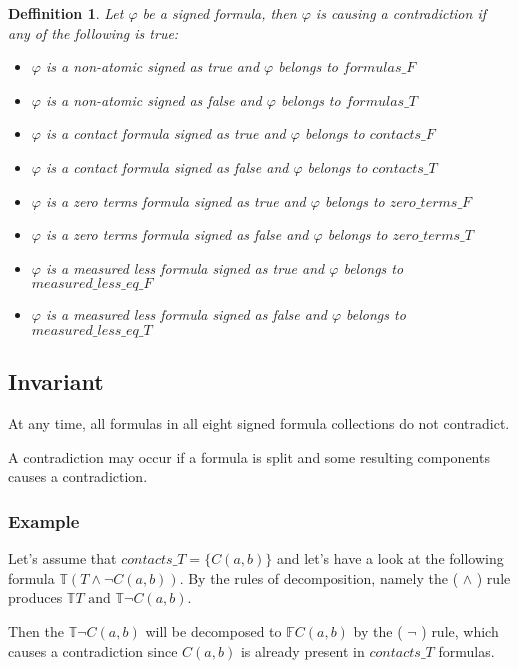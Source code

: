 \documentclass{article}
\newtheorem{defn}[theorem]{Deffinition}
\begin{document}
	\begin{defn}
	Let $\varphi$ be a signed formula, then $\varphi$ is causing a contradiction if any of the following is true:
	\begin{itemize}
		\item $\varphi$ is a non-atomic signed as true and $\varphi$ belongs to $formulas\_F$
		\item $\varphi$ is a non-atomic signed as false and $\varphi$ belongs to $formulas\_T$
		\item $\varphi$ is a contact formula signed as true and $\varphi$ belongs to $contacts\_F$
		\item $\varphi$ is a contact formula signed as false and $\varphi$ belongs to $contacts\_T$
		\item $\varphi$ is a zero terms formula signed as true and $\varphi$ belongs to $zero\_terms\_F$
		\item $\varphi$ is a zero terms formula signed as false and $\varphi$ belongs to $zero\_terms\_T$
		\item $\varphi$ is a measured less formula signed as true and $\varphi$ belongs to $measured\_less\_eq\_F$
		\item $\varphi$ is a measured less formula signed as false and $\varphi$ belongs to $measured\_less\_eq\_T$
	\end{itemize}
	\end{defn}
	\subsection*{Invariant}
	At any time, all formulas in all eight signed formula collections do not contradict.

	A contradiction may occur if a formula is split and some resulting components causes a contradiction.

	\subsubsection*{Example}
	Let's assume that $contacts\_T = \{ C(a, b)\}$ and let's have a look at the following formula $\mathbb{T}(T \wedge \neg C(a,b))$.
	\newline
	By the rules of decomposition, namely the ( $\wedge$ ) rule produces $\mathbb{T}T \text{ and } \mathbb{T}\neg C(a,b)$.

	Then the $\mathbb{T}\neg C(a,b)$ will be decomposed to $\mathbb{F} C(a,b)$ by the ( $\neg$ ) rule, which causes a contradiction since $C(a,b)$ is already present in $contacts\_T$ formulas.
\end{document}
